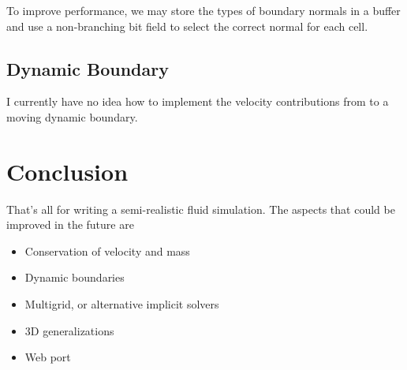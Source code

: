 \documentclass[11pt]{article}
\begin{document}
To improve performance, we may store the types of boundary normals in a buffer and use a non-branching bit field to select the correct normal for each cell.

\subsection{Dynamic Boundary}
I currently have no idea how to implement the velocity contributions from to a moving dynamic boundary.

\newpage
\section{Conclusion}
That's all for writing a semi-realistic fluid simulation. The aspects that could be improved in the future are
\begin{itemize}
	\item Conservation of velocity and mass
	\item Dynamic boundaries
	\item Multigrid, or alternative implicit solvers
	\item 3D generalizations
	\item Web port
\end{itemize}
\end{document}
